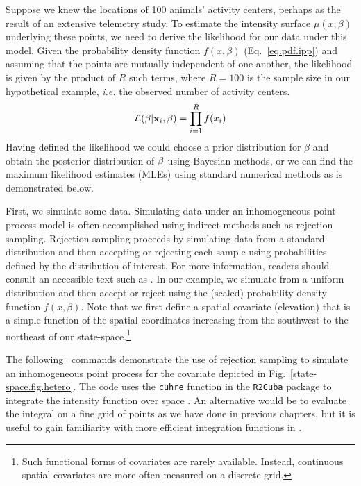 Suppose we knew the locations of 100 animals' activity
centers, perhaps as the result of an extensive telemetry study. To
estimate the intensity surface $\mu(x, \beta)$ underlying these
points, we need to derive the likelihood for our data under this
model. Given the probability density function $f(x, \beta)$
(Eq.~\ref{eq.pdf.ipp}) and assuming that the points are
mutually independent of one another,
the likelihood is given by the product
of $R$ such terms, where $R=100$ is the sample size in our
hypothetical example,
\emph{i.e.} the observed number of activity centers.
\[
\mathcal{L}({\bf \beta} | {\bf x}_i, \beta) = \prod_{i=1}^R f(x_i)
\]
Having defined the likelihood we could choose a prior distribution for
$\beta$ and obtain the posterior distribution of
$\bf \beta$ using Bayesian methods, or we can find the maximum likelihood
estimates (MLEs) using standard numerical methods as is demonstrated
below.

First, we simulate some data. Simulating data under an inhomogeneous point process model is often
accomplished using indirect methods such as rejection
sampling. Rejection sampling proceeds by
simulating data from a standard distribution and then accepting or
rejecting each sample using probabilities defined by the distribution
of interest. For more information, readers should consult an
accessible text such as \citet{robert_casella:2010}. In our example, we
simulate from a uniform distribution and then accept or reject using
the (scaled) probability density function $f(x, \beta)$. Note that we first define a
spatial covariate (elevation) that is a simple function of the spatial
coordinates increasing from the southwest to the northeast of our
state-space.\footnote{Such functional forms of
covariates are rarely available. Instead,  continuous spatial
covariates are more often measured on a discrete grid.}

The following \R~commands demonstrate the use of rejection sampling to
simulate an inhomogeneous point process for the covariate depicted in
Fig.~\ref{state-space.fig.hetero}. The code uses the \verb+cuhre+ function in
the {\tt R2Cuba} package to integrate the intensity function over
space \citep{hahn_etal:2011}. An alternative would be to evaluate the
integral on a fine grid of points as we have done in previous
chapters, but it is useful to gain familiarity with more efficient
integration functions in \R.

